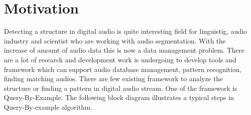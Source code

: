 \section{Motivation}


Detecting a structure in digital audio is quite interesting field for linguistig, audio industry and scientist who are working with audio segmentation. With the increase of amount of audio data this is now a data management problem. There are a lot of research and development work is undergoing to develop tools and framework which can support audio database management, pattern recognition, finding matching audios. There are few existing framework to analyze the structure or finding a pattern in digital audio stream. One of the framework is Query-By-Example. The following block diagram illustrates a typical steps in Query-By-example algorithm.


 
































